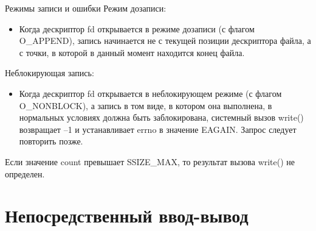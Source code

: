 \documentclass{beamer}
\begin{document}
\begin{frame}{Режимы записи и ошибки}
Режим дозаписи: 
\begin{itemize}
\item Когда дескриптор fd открывается в режиме дозаписи (с флагом O\_APPEND), запись начинается не с текущей позиции дескриптора файла, а с точки, в которой в данный момент находится конец файла.
\end{itemize}
Неблокирующая запись: 
\begin{itemize}
\item Когда дескриптор fd открывается в неблокирующем режиме (с флагом O_NONBLOCK),
а запись в том виде, в котором она выполнена, в нормальных условиях должна быть
заблокирована, системный вызов write() возвращает –1 и устанавливает errno в значение EAGAIN. Запрос следует повторить позже.
\end{itemize}
Если значение count превышает SSIZE\_MAX, то результат вызова write() не определен.
\end{frame}

\section{Непосредственный ввод-вывод}
\end{document}
